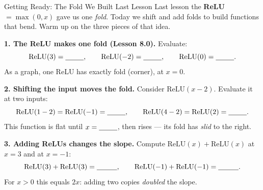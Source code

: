 \documentclass[10pt]{article}
\newcommand{\relu}{\mathrm{ReLU}}
\begin{document}
\namedateperiod

\vspace{0.12in}

\begin{notesbox}{Getting Ready: The Fold We Built Last Lesson}
\small Last lesson the \textbf{ReLU} $=\max(0,x)$ gave us one \emph{fold}. Today we shift and add folds to
build functions that bend. Warm up on the three pieces of that idea.

\vspace{4pt}
\textbf{1. The ReLU makes one fold (Lesson 8.0).} Evaluate:
\[
  \relu(3)=\blank{0.9cm},\qquad \relu(-2)=\blank{0.9cm},\qquad \relu(0)=\blank{0.9cm}.
\]
As a graph, one ReLU has exactly \blank{1.2cm} fold (corner), at $x=0$.

\vspace{4pt}
\textbf{2. Shifting the input moves the fold.} Consider $\relu(x-2)$. Evaluate it at two inputs:
\[
  \relu(1-2)=\relu(-1)=\blank{0.9cm},\qquad \relu(4-2)=\relu(2)=\blank{0.9cm}.
\]
This function is flat until $x=\blank{0.9cm}$, then rises --- its fold has \emph{slid} to the right.

\vspace{4pt}
\textbf{3. Adding ReLUs changes the slope.} Compute $\relu(x)+\relu(x)$ at $x=3$ and at $x=-1$:
\[
  \relu(3)+\relu(3)=\blank{1.0cm},\qquad \relu(-1)+\relu(-1)=\blank{1.0cm}.
\]
For $x>0$ this equals $2x$: adding two copies \emph{doubled} the slope.
\end{notesbox}
\end{document}
